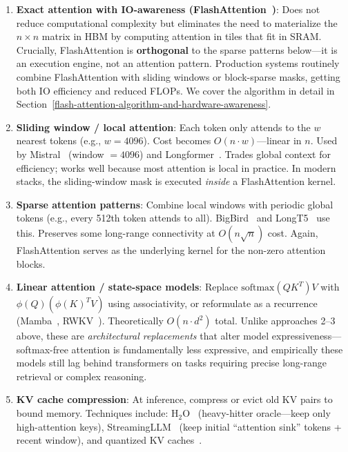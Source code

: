 \begin{enumerate}
  \item \textbf{Exact attention with IO-awareness (FlashAttention~\cite{dao2022flashattention})}: Does not reduce computational complexity but eliminates the need to materialize the $n \times n$ matrix in HBM by computing attention in tiles that fit in SRAM. Crucially, FlashAttention is \textbf{orthogonal} to the sparse patterns below---it is an execution engine, not an attention pattern. Production systems routinely combine FlashAttention with sliding windows or block-sparse masks, getting both IO efficiency and reduced FLOPs. We cover the algorithm in detail in Section~\ref{flash-attention-algorithm-and-hardware-awareness}.
  \item \textbf{Sliding window / local attention}: Each token only attends to the $w$ nearest tokens (e.g., $w = 4096$). Cost becomes $O(n \cdot w)$---linear in $n$. Used by Mistral~\cite{jiang2023mistral} (window $= 4096$) and Longformer~\cite{beltagy2020longformer}. Trades global context for efficiency; works well because most attention is local in practice. In modern stacks, the sliding-window mask is executed \emph{inside} a FlashAttention kernel.
  \item \textbf{Sparse attention patterns}: Combine local windows with periodic global tokens (e.g., every 512th token attends to all). BigBird~\cite{zaheer2020bigbird} and LongT5~\cite{guo2022longt5} use this. Preserves some long-range connectivity at $O(n\sqrt{n})$ cost. Again, FlashAttention serves as the underlying kernel for the non-zero attention blocks.
  \item \textbf{Linear attention / state-space models}: Replace $\text{softmax}(QK^T)V$ with $\phi(Q)(\phi(K)^T V)$ using associativity, or reformulate as a recurrence (Mamba~\cite{gu2023mamba}, RWKV~\cite{peng2023rwkv}). Theoretically $O(n \cdot d^2)$ total. Unlike approaches 2--3 above, these are \emph{architectural replacements} that alter model expressiveness---softmax-free attention is fundamentally less expressive, and empirically these models still lag behind transformers on tasks requiring precise long-range retrieval or complex reasoning.
  \item \textbf{KV cache compression}: At inference, compress or evict old KV pairs to bound memory. Techniques include: H$_2$O~\cite{zhang2023h2o} (heavy-hitter oracle---keep only high-attention keys), StreamingLLM~\cite{xiao2024streamingllm} (keep initial ``attention sink'' tokens + recent window), and quantized KV caches~\cite{liu2024kivi}.
\end{enumerate}


